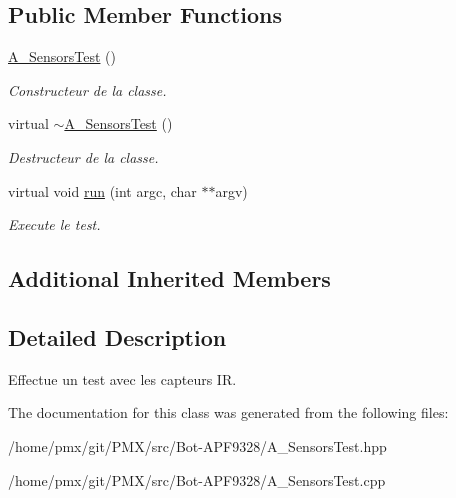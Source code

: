 \subsection*{Public Member Functions}
\begin{DoxyCompactItemize}
\item 
\mbox{\label{classA__SensorsTest_a7c5fe54d684cf2123d8db9badf4a6df6}} 
\hyperlink{classA__SensorsTest_a7c5fe54d684cf2123d8db9badf4a6df6}{A\+\_\+\+Sensors\+Test} ()
\begin{DoxyCompactList}\small\item\em Constructeur de la classe. \end{DoxyCompactList}\item 
\mbox{\label{classA__SensorsTest_ad1a7742b16a694a4c17aa36b4c4eb8a0}} 
virtual \hyperlink{classA__SensorsTest_ad1a7742b16a694a4c17aa36b4c4eb8a0}{$\sim$\+A\+\_\+\+Sensors\+Test} ()
\begin{DoxyCompactList}\small\item\em Destructeur de la classe. \end{DoxyCompactList}\item 
\mbox{\label{classA__SensorsTest_a862d3ed0b994946f6ac42280515b2c36}} 
virtual void \hyperlink{classA__SensorsTest_a862d3ed0b994946f6ac42280515b2c36}{run} (int argc, char $\ast$$\ast$argv)
\begin{DoxyCompactList}\small\item\em Execute le test. \end{DoxyCompactList}\end{DoxyCompactItemize}
\subsection*{Additional Inherited Members}


\subsection{Detailed Description}
Effectue un test avec les capteurs IR. 

The documentation for this class was generated from the following files\+:\begin{DoxyCompactItemize}
\item 
/home/pmx/git/\+P\+M\+X/src/\+Bot-\/\+A\+P\+F9328/A\+\_\+\+Sensors\+Test.\+hpp\item 
/home/pmx/git/\+P\+M\+X/src/\+Bot-\/\+A\+P\+F9328/A\+\_\+\+Sensors\+Test.\+cpp\end{DoxyCompactItemize}
